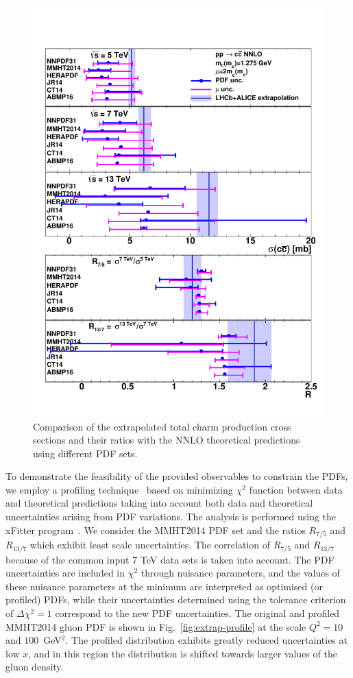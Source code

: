 \documentclass[12pt,a4paper]{article}
\begin{document}
\begin{figure}
    \centering
    \includegraphics[width=1.0\textwidth]{figs/plot5.pdf}
    \caption{Comparison of the extrapolated total charm production cross sections and their ratios with the NNLO theoretical predictions using different PDF sets.}
    \label{fig:extrap}
\end{figure}

To demonstrate the feasibility of the provided observables to constrain the PDFs, we employ a profiling technique~\cite{Paukkunen:2014zia} based on minimizing $\chi^2$ function between data and theoretical predictions taking into account both data and theoretical uncertainties arising from PDF variations. The analysis is performed using the xFitter program~\cite{Alekhin:2014irh}. We consider the MMHT2014 PDF set and the ratios $R_{7/5}$ and $R_{13/7}$ which exhibit least scale uncertainties. The correlation of $R_{7/5}$ and $R_{13/7}$ because of the common input 7 TeV data sets is taken into account. The PDF uncertainties are included in $\chi^2$ through nuisance parameters, and the values of these nuisance parameters at the minimum are interpreted as optimised (or profiled) PDFs, while their uncertainties determined using the tolerance criterion of $\Delta\chi^2 = 1$ correspond to the new PDF uncertainties. The original and profiled MMHT2014 gluon PDF is shown in Fig.~\ref{fig:extrap-profile} at the scale $Q^2 = 10$ and $100$~GeV$^2$. The profiled distribution exhibits greatly reduced uncertainties at low $x$, and in this region the distribution is shifted towards larger values of the gluon density.
\end{document}
